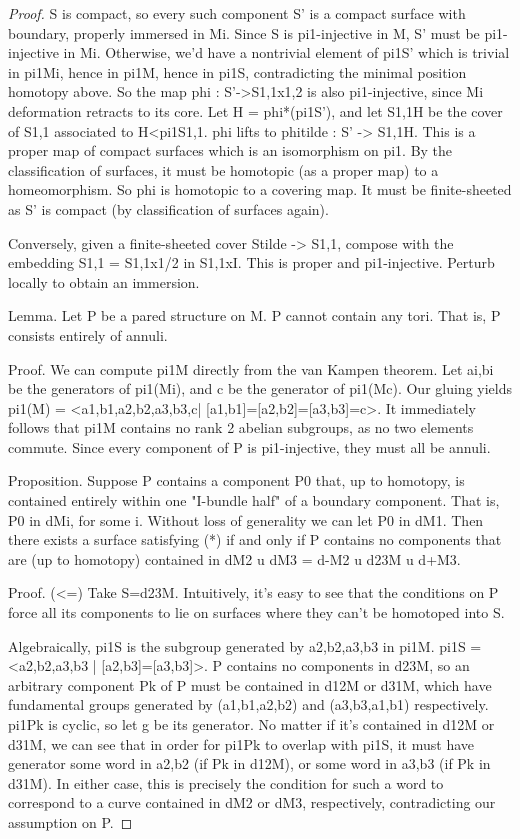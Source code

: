 \documentclass[12pt]{amsart}
\theoremstyle{definition}
\begin{document}
\begin{proof}

S is compact, so every such component S' is a compact surface with
boundary, properly immersed in Mi. Since S is pi1-injective in M, S' must be
pi1-injective in Mi. Otherwise, we'd have a nontrivial element of pi1S' which
is trivial in pi1Mi, hence in pi1M, hence in pi1S, contradicting the minimal
position homotopy above. So the map phi : S'->S1,1x{1,2} is also pi1-injective,
since Mi deformation retracts to its core. Let H = phi*(pi1S'), and let S1,1H
be the cover of S1,1 associated to H<pi1S1,1. phi lifts to phitilde : S' ->
S1,1H. This is a proper map of compact surfaces which is an isomorphism on pi1.
By the classification of surfaces, it must be homotopic (as a proper map) to
a homeomorphism. So phi is homotopic to a covering map. It must be
finite-sheeted as S' is compact (by classification of surfaces again).

Conversely, given a finite-sheeted cover Stilde -> S1,1, compose with the
embedding S1,1 = S1,1x{1/2} in S1,1xI. This is proper and pi1-injective.
Perturb locally to obtain an immersion.

Lemma. Let P be a pared structure on M. P cannot contain any tori. That is,
P consists entirely of annuli.

Proof. We can compute pi1M directly from the van Kampen theorem. Let ai,bi be
the generators of pi1(Mi), and c be the generator of pi1(Mc). Our gluing yields
pi1(M) = <a1,b1,a2,b2,a3,b3,c| [a1,b1]=[a2,b2]=[a3,b3]=c>. It immediately
follows that pi1M contains no rank 2 abelian subgroups, as no two elements
commute. Since every component of P is pi1-injective, they must all be annuli.

Proposition. Suppose P contains a component P0 that, up to homotopy, is
contained entirely within one "I-bundle half" of a boundary component. That is,
P0 in dMi, for some i. Without loss of generality we can let P0 in dM1. Then
there exists a surface satisfying (*) if and only if P contains no components
that are (up to homotopy) contained in dM2 u dM3 = d-M2 u d23M u d+M3.

Proof. (<=) Take S=d23M. Intuitively, it's easy to see that the conditions on
P force all its components to lie on surfaces where they can't be homotoped
into S.

Algebraically, pi1S is the subgroup generated by
a2,b2,a3,b3 in pi1M. pi1S = <a2,b2,a3,b3 | [a2,b3]=[a3,b3]>. P contains no
components in d23M, so an arbitrary component Pk of P  must be contained in
d12M or d31M, which have fundamental groups generated by (a1,b1,a2,b2) and
(a3,b3,a1,b1) respectively. pi1Pk is cyclic, so let g be its generator. No
matter if it's contained in d12M or d31M, we can see that in order for pi1Pk to
overlap with pi1S, it must have generator some word in a2,b2 (if Pk in d12M),
or some word in a3,b3 (if Pk in d31M). In either case, this is precisely the
condition for such a word to correspond to a curve contained in dM2 or dM3,
respectively, contradicting our assumption on P.


\end{proof}
\end{document}
